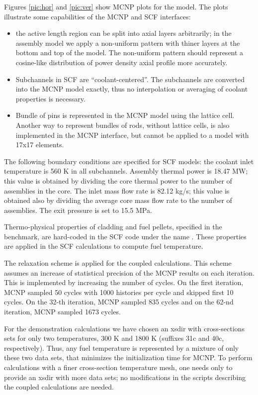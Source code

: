 \documentclass[a4paper,10pt,twocolumn,english]{sphinxsnamc2013}
\begin{document}
Figures \ref{pic:hor} and  \ref{pic:ver} show MCNP
plots for the model. The plots illustrate some capabilities of the MCNP and SCF
interfaces:
\begin{itemize}
\item {} 
the active length region can be split into axial layers arbitrarily;
in the assembly model we apply a non-uniform pattern with thiner layers at
the bottom and top of the model. The non-uniform pattern should represent a
cosine-like distribution of power density axial profile more accurately.

\item {} 
Subchannels in SCF are ``coolant-centered''. The subchannels are converted
into the MCNP model exactly, thus no interpolation or averaging of coolant
properties is necessary.

\item {} 
Bundle of pins is represented in the MCNP model using the lattice cell.
Another way to represent bundles of rods, without lattice cells, is also
implemented in the MCNP interface, but cannot be applied to a model with
17x17 elements.

\end{itemize}

The following boundary conditions are specified for SCF models: the coolant
inlet temperature is 560 K in all subchannels. Assembly thermal power is 18.47
MW; this value is obtained by dividing the core thermal power to the number of
assemblies in the core. The inlet mass flow rate is 82.12 kg/s; this value is
obtained also by dividing the average core mass flow rate to the number of
assemblies. The exit pressure is set to 15.5 MPa.

Thermo-physical properties of cladding and fuel pellets, specified in the
benchmark, are hard-coded in the SCF code under the name . These
properties are applied in the SCF calculations to compute fuel temperature.

The relaxation scheme \cite{dufek2006} is applied for the
coupled calculations. This scheme assumes an increase of statistical precision of
the MCNP results on each iteration. This is implemented by increasing the number of cycles. On
the first iteration, MCNP sampled 50 cycles with 1000 histories per cycle and
skipped first 10 cycles. On the 32-th iteration, MCNP sampled 835 cycles and on
the 62-nd iteration, MCNP sampled 1673 cycles.

For the demonstration calculations we have chosen an xsdir
with cross-sections sets for only two temperatures, 300 K and 1800 K (suffixes
31c and 40c, respectively). Thus, any fuel temperature is represented by a
mixture of only these two data sets, that minimizes the initialization time for
MCNP. To perform calculations with a finer cross-section temperature mesh, one
needs only to provide an xsdir with more data sets; no modifications in the
scripts describing the coupled calculations are needed.
\end{document}
